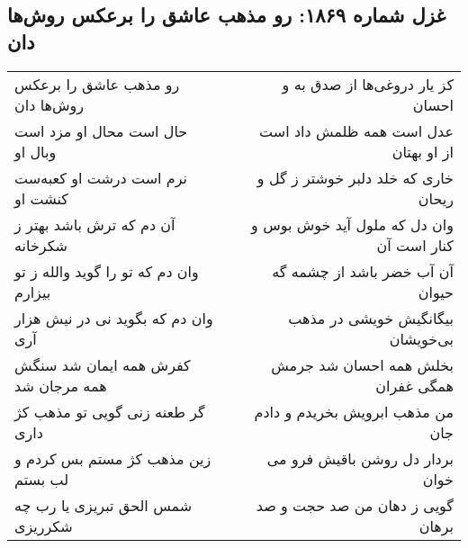 \begin{center}
\section*{غزل شماره ۱۸۶۹: رو مذهب عاشق را برعکس روش‌ها دان}
\label{sec:1869}
\begin{longtable}{l p{0.5cm} r}
رو مذهب عاشق را برعکس روش‌ها دان
&&
کز یار دروغی‌ها از صدق به و احسان
\\
حال است محال او مزد است وبال او
&&
عدل است همه ظلمش داد است از او بهتان
\\
نرم است درشت او کعبه‌ست کنشت او
&&
خاری که خلد دلبر خوشتر ز گل و ریحان
\\
آن دم که ترش باشد بهتر ز شکرخانه
&&
وان دل که ملول آید خوش بوس و کنار است آن
\\
وان دم که تو را گوید والله ز تو بیزارم
&&
آن آب خضر باشد از چشمه گه حیوان
\\
وان دم که بگوید نی در نیش هزار آری
&&
بیگانگیش خویشی در مذهب بی‌خویشان
\\
کفرش همه ایمان شد سنگش همه مرجان شد
&&
بخلش همه احسان شد جرمش همگی غفران
\\
گر طعنه زنی گویی تو مذهب کژ داری
&&
من مذهب ابرویش بخریدم و دادم جان
\\
زین مذهب کژ مستم بس کردم و لب بستم
&&
بردار دل روشن باقیش فرو می خوان
\\
شمس الحق تبریزی یا رب چه شکرریزی
&&
گویی ز دهان من صد حجت و صد برهان
\\
\end{longtable}
\end{center}
